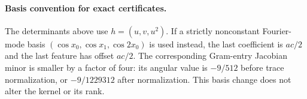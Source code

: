 \paragraph{Basis convention for exact certificates.}
The determinants above use $h=(u,v,u^2)$. If a strictly nonconstant
Fourier-mode basis $(\cos x_0,\cos x_1,\cos2x_0)$ is used instead,
the last coefficient is $ac/2$ and the last feature has offset $ac/2$.
The corresponding Gram-entry Jacobian minor is smaller by a factor
of four: its angular value is $-9/512$ before trace normalization,
or $-9/1229312$ after normalization. This basis change does not
alter the kernel or its rank.
